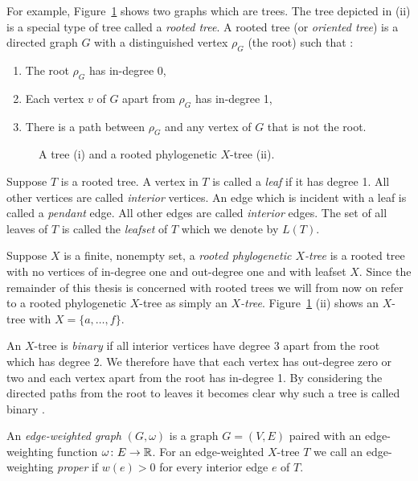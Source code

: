 For example, Figure~\ref{fig:x-tree-ex} shows two graphs which are trees.  The
tree depicted in (ii) is a special type of tree called a \textit{rooted tree}.
A rooted tree (or \textit{oriented tree}) is a directed graph $G$ with a
distinguished vertex $\rho_G$ (the root) such that \cite{knuth97taocp1}:
\begin{enumerate}[label=\alph*)]
\item The root $\rho_G$ has in-degree 0,
\item Each vertex $v$ of $G$ apart from $\rho_G$ has in-degree 1,
\item There is a path between $\rho_G$ and any vertex of $G$ that is not the
  root.
\end{enumerate}

\begin{figure}
  \centering
  
  \caption{A tree (i) and a rooted phylogenetic $X$-tree
    (ii).}
  \label{fig:x-tree-ex}
\end{figure}

Suppose $T$ is a rooted tree.  A vertex in $T$ is called a \textit{leaf} if it
has degree 1.  All other vertices are called \textit{interior} vertices.  An
edge which is incident with a leaf is called a \textit{pendant} edge.  All
other edges are called \textit{interior} edges.  The set of all leaves of $T$
is called the \textit{leafset} of $T$ which we denote by $L(T)$.

Suppose $X$ is a finite, nonempty set, a \textit{rooted phylogenetic $X$-tree}
is a rooted tree with no vertices of in-degree one and out-degree one and with
leafset $X$.  Since the remainder of this thesis is concerned with rooted
trees we will from now on refer to a rooted phylogenetic $X$-tree as simply an
\textit{$X$-tree}.  Figure~\ref{fig:x-tree-ex} (ii) shows an $X$-tree with $X
= \{a,\dotsc,f\}$.

An $X$-tree is \textit{binary} if all interior vertices have degree 3 apart
from the root which has degree 2.  We therefore have that each vertex has
out-degree zero or two and each vertex apart from the root has in-degree 1.
By considering the directed paths from the root to leaves it becomes clear why
such a tree is called binary \cite{semple2003phylogenetics}.

An \textit{edge-weighted graph} $(G,\omega)$ is a graph $G=(V,E)$ paired with
an edge-weighting function $\omega \colon E \to {\mathbb R}$.  For an edge-weighted
$X$-tree $T$ we call an edge-weighting \textit{proper} if $w(e) > 0$ for every
interior edge $e$ of $T$.

